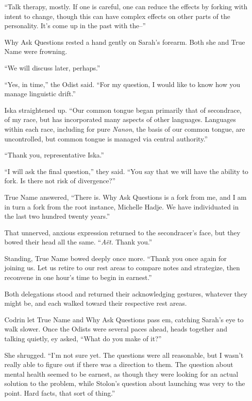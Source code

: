 ``Talk therapy, mostly. If one is careful, one can reduce the effects by forking with intent to change, though this can have complex effects on other parts of the personality. It's come up in the past with the--''

Why Ask Questions rested a hand gently on Sarah's forearm. Both she and True Name were frowning.

``We will discuss later, perhaps.''

``Yes, in time,'' the Odist said. ``For my question, I would like to know how you manage linguistic drift.''

Iska straightened up. ``Our common tongue began primarily that of secondrace, of my race, but has incorporated many aspects of other languages. Languages within each race, including for pure \emph{Nanon}, the basis of our common tongue, are uncontrolled, but common tongue is managed via central authority.''

``Thank you, representative Iska.''

``I will ask the final question,'' they said. ``You say that we will have the ability to fork. Is there not risk of divergence?''

True Name answered, ``There is. Why Ask Questions is a fork from me, and I am in turn a fork from the root instance, Michelle Hadje. We have individuated in the last two hundred twenty years.''

That unnerved, anxious expression returned to the secondracer's face, but they bowed their head all the same. ``\emph{Aët.} Thank you.''

Standing, True Name bowed deeply once more. ``Thank you once again for joining us. Let us retire to our rest areas to compare notes and strategize, then reconvene in one hour's time to begin in earnest.''

Both delegations stood and returned their acknowledging gestures, whatever they might be, and each walked toward their respective rest areas.

Codrin let True Name and Why Ask Questions pass em, catching Sarah's eye to walk slower. Once the Odists were several paces ahead, heads together and talking quietly, ey asked, ``What do you make of it?''

She shrugged. ``I'm not sure yet. The questions were all reasonable, but I wasn't really able to figure out if there was a direction to them. The question about mental health seemed to be earnest, as though they were looking for an actual solution to the problem, while Stolon's question about launching was very to the point. Hard facts, that sort of thing.''

